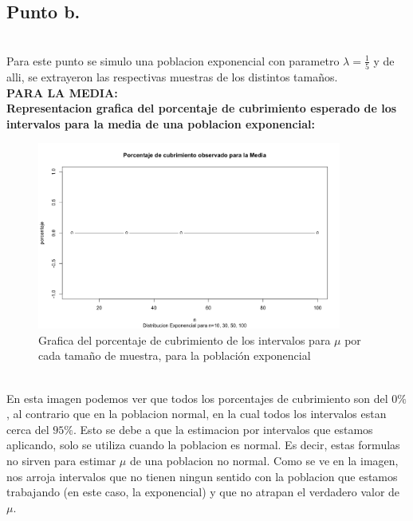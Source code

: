 \documentclass[letterpaper,12pt,onecolumn,titlepage]{article}
\begin{document}
\pagebreak\subsection{Punto b.}
~\\ Para este punto se simulo una poblacion exponencial con parametro $\lambda=\frac{1}{5}$ y de alli, se extrayeron las respectivas muestras de los distintos tama\~{n}os.
~\\ \textbf{PARA LA MEDIA:}
~\\\textbf{Representacion grafica del porcentaje de cubrimiento esperado de los intervalos para la media de una poblacion exponencial:}
~\\ \begin{figure}[!h]
    \begin{center}
        \includegraphics[width=10cm]{Figuras/Pc1.png}
        \caption{Grafica del porcentaje de cubrimiento de los intervalos para $\mu$ por cada tama\~{n}o de muestra, para la poblaci\'{o}n exponencial}
        \label{fig:Densidad}
    \end{center}
\end{figure}
~\\ En esta imagen podemos ver que todos los porcentajes de cubrimiento son del $0\%$, al contrario que en la poblacion normal, en la cual todos los intervalos estan cerca del $95\%$. Esto se debe a que la estimacion por intervalos que estamos aplicando, solo se utiliza cuando la poblacion es normal. Es decir, estas formulas no sirven para estimar $\mu$ de una poblacion no normal. Como se ve en la imagen, nos arroja intervalos que no tienen ningun sentido con la poblacion que estamos trabajando (en este caso, la exponencial) y que no atrapan el verdadero valor de $\mu$.
\end{document}
